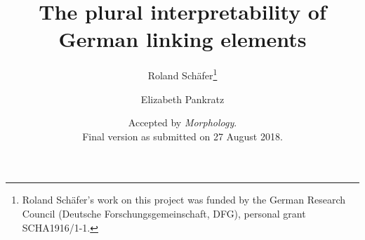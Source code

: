 \usepackage{natbib}


\usepackage[margin=4cm]{geometry}

\usepackage{authblk}
\author[1]{Roland Schäfer\thanks{Roland Schäfer's work on this project was funded by the German Research Council (Deutsche Forschungsgemeinschaft, DFG), personal grant SCHA1916/1-1.}}
\author[2]{Elizabeth Pankratz}

\title{The plural interpretability of German linking elements}
\date{Accepted by \textit{Morphology}.\\[0.25\baselineskip]Final version as submitted on 27 August 2018.}

\newenvironment{acknowledgements}{\section*{Acknowledgements}}{}
\newenvironment{ethicalstandards}{\section*{Compliance with ethical standards}}{}
\newcommand{\keywords}[1]{\newline\vspace{\baselineskip}\newline\noindent \textbf{Keywords: #1}}

\newcommand{\TheDOI}{\url{https://doi.org/10.5281/zenodo.1323211}}
\newcommand{\TheUniversity}{Freie Universität Berlin}
